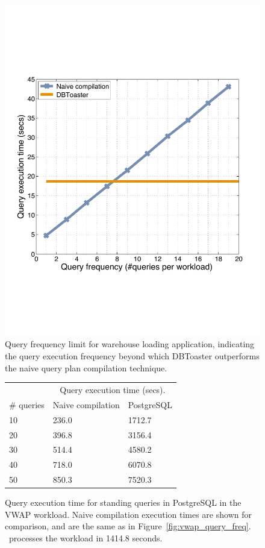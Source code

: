 \begin{figure}[htbp]
\begin{center}
\includegraphics[scale=0.25]{../plots/ssb_query_freq_dn}
\end{center}
\caption{Query frequency limit for warehouse loading application, indicating the
query execution frequency beyond which DBToaster outperforms the naive query
plan compilation technique.}
\label{fig:ssb_query_freq}
\end{figure}

\begin{figure}
\begin{center}
\begin{tabular}{|l|l|l|}
\hline
& \multicolumn{2}{c|}{Query execution time (secs).} \\
\# queries & Naive compilation & PostgreSQL \\
\hline
10 & 236.0 & 1712.7 \\
20 & 396.8 & 3156.4 \\
30 & 514.4 & 4580.2 \\
40 & 718.0 & 6070.8 \\
50 & 850.3 & 7520.3 \\
\hline 
\end{tabular}
\end{center}
\caption{Query execution time for standing queries in PostgreSQL in the VWAP
workload. Naive compilation execution times are shown for comparison, and are
the same as in Figure~\ref{fig:vwap_query_freq}. \compiler\ processes the
workload in 1414.8 seconds.}
\label{tab:ssb_query_freq}
\end{figure}

